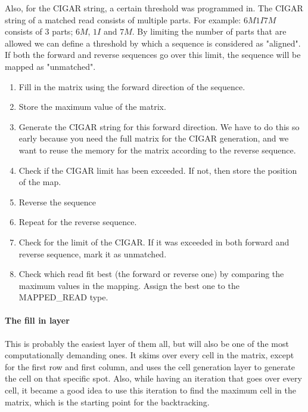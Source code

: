 Also, for the CIGAR string, a certain threshold was programmed in. The CIGAR string of a matched read consists of multiple parts. For example: $6M1I7M$ consists of 3 parts; $6M$, $1I$ and $7M$. By limiting the number of parts that are allowed we can define a threshold by which a sequence is considered as "aligned". If both the forward and reverse sequences go over this limit, the sequence will be mapped as "unmatched".

\begin{enumerate}
	\item Fill in the matrix using the forward direction of the sequence.
	\item Store the maximum value of the matrix.
	\item Generate the CIGAR string for this forward direction. We have to do this so early because you need the full matrix for the CIGAR generation, and we want to reuse the memory for the matrix according to the reverse sequence.
	\item Check if the CIGAR limit has been exceeded. If not, then store the position of the map. 
	\item Reverse the sequence
	\item Repeat for the reverse sequence.
	\item Check for the limit of the CIGAR. If it was exceeded in both forward and reverse sequence, mark it as unmatched.
	\item Check which read fit best (the forward or reverse one) by comparing the maximum values in the mapping. Assign the best one to the MAPPED\_READ type.
\end{enumerate}

\paragraph{The fill in layer}
This is probably the easiest layer of them all, but will also be one of the most computationally demanding ones. It skims over every cell in the matrix, except for the first row and first column, and uses the cell generation layer to generate the cell on that specific spot. Also, while having an iteration that goes over every cell, it became a good idea to use this iteration to find the maximum cell in the matrix, which is the starting point for the backtracking.

